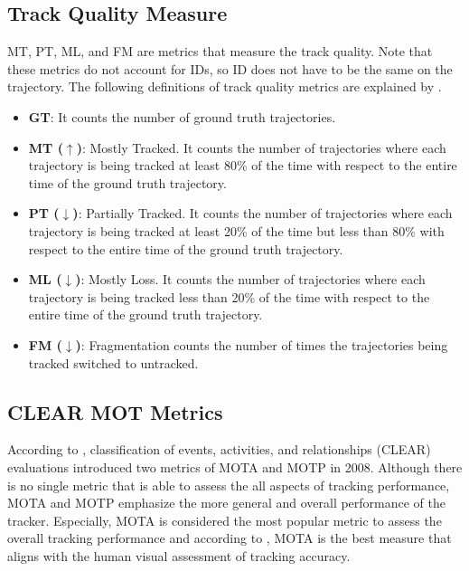 \subsection{Track Quality Measure}
MT, PT, ML, and FM are metrics that measure the track quality. Note that these metrics do not account for IDs, so ID does not have to be the same on the trajectory. The following definitions of track quality metrics are explained by \cite{milan_mot16_2016}.

\begin{itemize}

\item \textbf{GT}: It counts the number of ground truth trajectories.

\item \textbf{MT ($\uparrow$)}: Mostly Tracked. It counts the number of trajectories where each trajectory is being tracked at least 80\% of the time with respect to the entire time of the ground truth trajectory.

\item \textbf{PT ($\downarrow$)}: Partially Tracked. It counts the number of trajectories where each trajectory is being tracked at least 20\% of the time but less than 80\% with respect to the entire time of the ground truth trajectory.

\item \textbf{ML ($\downarrow$)}: Mostly Loss. It counts the number of trajectories where each trajectory is being tracked less than 20\% of the time with respect to the entire time of the ground truth trajectory.

\item \textbf{FM ($\downarrow$)}: Fragmentation counts the number of times the trajectories being tracked switched to untracked.
\end{itemize}



\subsection{CLEAR MOT Metrics}
According to \cite{bernardin_evaluating_2008}, classification of events, activities, and relationships (CLEAR) evaluations introduced two metrics of MOTA and MOTP in 2008.
Although there is no single metric that is able to assess the all aspects of tracking performance, MOTA and MOTP emphasize the more general and overall performance of the tracker. Especially, MOTA is considered the most popular metric to assess the overall tracking performance \cite{milan_mot16_2016} and according to \cite{leal-taixe_tracking_2017}, MOTA is the best measure that aligns with the human visual assessment of tracking accuracy.

